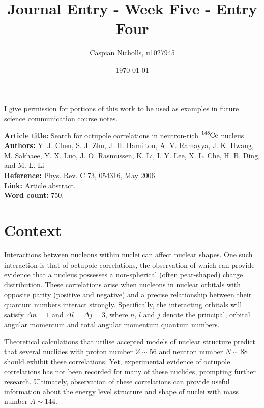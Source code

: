 \documentclass[12pt,a4paper]{article}
\begin{document}
\title{Journal Entry - Week Five - Entry Four}
\author{Caspian Nicholls, u1027945}
\date{\today}

\maketitle

\noindent
I give permission for portions of this work to be used as examples in future science communication course notes.

\medskip
\noindent
\textbf{Article title:} Search for octupole correlations in neutron-rich $\ce{^{148}Ce}$ nucleus \\
\textbf{Authors:} Y. J. Chen, S. J. Zhu, J. H. Hamilton, A. V. Ramayya, J. K. Hwang, M. Sakhaee, Y. X. Luo, J. O. Rasmussen, K. Li, I. Y. Lee, X. L. Che, H. B. Ding, and M. L. Li \\
\textbf{Reference:} Phys. Rev. C 73, 054316, May 2006. \\
\textbf{Link:}  \href{10.1103/PhysRevC.73.054316}{Article abstract}. \\
\textbf{Word count:} 750.

\section*{Context}
Interactions between nucleons within nuclei can affect nuclear shapes.
One such interaction is that of octupole correlations, the observation of which can provide evidence that a nucleus possesses a non-spherical (often pear-shaped) charge distribution.
These correlations arise when nucleons in nuclear orbitals with opposite parity (positive and negative) and a precise relationship between their quantum numbers interact strongly.
Specifically, the interacting orbitals will satisfy $\Delta n = 1$ and $\Delta l = \Delta j = 3$, where $n$, $l$ and $j$ denote the principal, orbital angular momentum and total angular momentum quantum numbers.

\medskip
Theoretical calculations that utilise accepted models of nuclear structure predict that several nuclides with proton number $Z \sim 56$ and neutron number $N \sim 88$ should exhibit these correlations.
Yet, experimental evidence of octupole correlations has not been recorded for many of these nuclides, prompting further research.
Ultimately, observation of these correlations can provide useful information about the energy level structure and shape of nuclei with mass number $A\sim144$.
\end{document}
